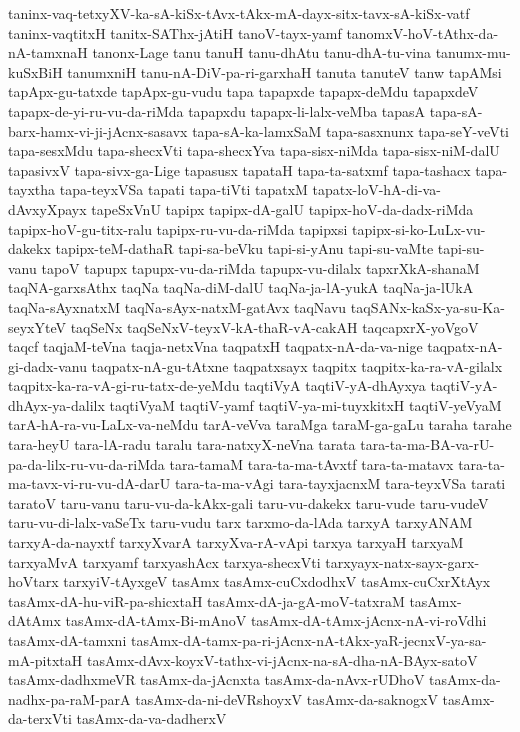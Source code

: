 {taninx-vaq-tetxyXV-ka-sA-kiSx-tAvx-tAkx-mA-dayx-sitx-tavx-sA-kiSx-vatf
taninx-vaqtitxH
tanitx-SAThx-jAtiH
tanoV-tayx-yamf
tanomxV-hoV-tAthx-da-nA-tamxnaH
tanonx-Lage
tanu
tanuH
tanu-dhAtu
tanu-dhA-tu-vina
tanumx-mu-kuSxBiH
tanumxniH
tanu-nA-DiV-pa-ri-garxhaH
tanuta
tanuteV
tanw
tapAMsi
tapApx-gu-tatxde
tapApx-gu-vudu
tapa
tapapxde
tapapx-deMdu
tapapxdeV
tapapx-de-yi-ru-vu-da-riMda
tapapxdu
tapapx-li-lalx-veMba
tapasA
tapa-sA-barx-hamx-vi-ji-jAcnx-sasavx
tapa-sA-ka-lamxSaM
tapa-sasxnunx
tapa-seY-veVti
tapa-sesxMdu
tapa-shecxVti
tapa-shecxYva
tapa-sisx-niMda
tapa-sisx-niM-dalU
tapasivxV
tapa-sivx-ga-Lige
tapasusx
tapataH
tapa-ta-satxmf
tapa-tashacx
tapa-tayxtha
tapa-teyxVSa
tapati
tapa-tiVti
tapatxM
tapatx-loV-hA-di-va-dAvxyXpayx
tapeSxVnU
tapipx
tapipx-dA-galU
tapipx-hoV-da-dadx-riMda
tapipx-hoV-gu-titx-ralu
tapipx-ru-vu-da-riMda
tapipxsi
tapipx-si-ko-LuLx-vu-dakekx
tapipx-teM-dathaR
tapi-sa-beVku
tapi-si-yAnu
tapi-su-vaMte
tapi-su-vanu
tapoV
tapupx
tapupx-vu-da-riMda
tapupx-vu-dilalx
tapxrXkA-shanaM
taqNA-garxsAthx
taqNa
taqNa-diM-dalU
taqNa-ja-lA-yukA
taqNa-ja-lUkA
taqNa-sAyxnatxM
taqNa-sAyx-natxM-gatAvx
taqNavu
taqSANx-kaSx-ya-su-Ka-seyxYteV
taqSeNx
taqSeNxV-teyxV-kA-thaR-vA-cakAH
taqcapxrX-yoVgoV
taqcf
taqjaM-teVna
taqja-netxVna
taqpatxH
taqpatx-nA-da-va-nige
taqpatx-nA-gi-dadx-vanu
taqpatx-nA-gu-tAtxne
taqpatxsayx
taqpitx
taqpitx-ka-ra-vA-gilalx
taqpitx-ka-ra-vA-gi-ru-tatx-de-yeMdu
taqtiVyA
taqtiV-yA-dhAyxya
taqtiV-yA-dhAyx-ya-dalilx
taqtiVyaM
taqtiV-yamf
taqtiV-ya-mi-tuyxkitxH
taqtiV-yeVyaM
tarA-hA-ra-vu-LaLx-va-neMdu
tarA-veVva
taraMga
taraM-ga-gaLu
taraha
tarahe
tara-heyU
tara-lA-radu
taralu
tara-natxyX-neVna
tarata
tara-ta-ma-BA-va-rU-pa-da-lilx-ru-vu-da-riMda
tara-tamaM
tara-ta-ma-tAvxtf
tara-ta-matavx
tara-ta-ma-tavx-vi-ru-vu-dA-darU
tara-ta-ma-vAgi
tara-tayxjacnxM
tara-teyxVSa
tarati
taratoV
taru-vanu
taru-vu-da-kAkx-gali
taru-vu-dakekx
taru-vude
taru-vudeV
taru-vu-di-lalx-vaSeTx
taru-vudu
tarx
tarxmo-da-lAda
tarxyA
tarxyANAM
tarxyA-da-nayxtf
tarxyXvarA
tarxyXva-rA-vApi
tarxya
tarxyaH
tarxyaM
tarxyaMvA
tarxyamf
tarxyashAcx
tarxya-shecxVti
tarxyayx-natx-sayx-garx-hoVtarx
tarxyiV-tAyxgeV
tasAmx
tasAmx-cuCxdodhxV
tasAmx-cuCxrXtAyx
tasAmx-dA-hu-viR-pa-shicxtaH
tasAmx-dA-ja-gA-moV-tatxraM
tasAmx-dAtAmx
tasAmx-dA-tAmx-Bi-mAnoV
tasAmx-dA-tAmx-jAcnx-nA-vi-roVdhi
tasAmx-dA-tamxni
tasAmx-dA-tamx-pa-ri-jAcnx-nA-tAkx-yaR-jecnxV-ya-sa-mA-pitxtaH
tasAmx-dAvx-koyxV-tathx-vi-jAcnx-na-sA-dha-nA-BAyx-satoV
tasAmx-dadhxmeVR
tasAmx-da-jAcnxta
tasAmx-da-nAvx-rUDhoV
tasAmx-da-nadhx-pa-raM-parA
tasAmx-da-ni-deVRshoyxV
tasAmx-da-saknogxV
tasAmx-da-terxVti
tasAmx-da-va-dadherxV
}
